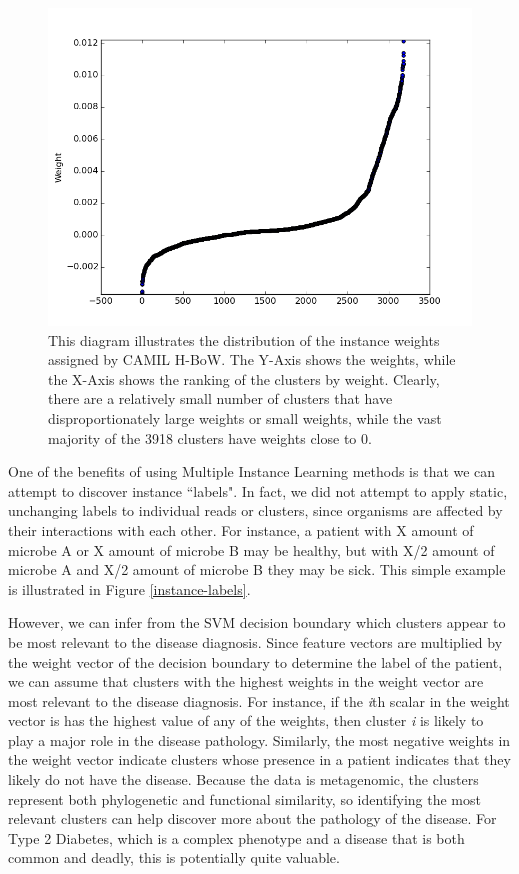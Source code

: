 \begin{figure}[h]
\centering
\includegraphics[scale=0.4]{./instance-scatter.png}
\caption{This diagram illustrates the distribution of the instance weights assigned by CAMIL H-BoW. The Y-Axis shows the weights, while the X-Axis shows the ranking of the clusters by weight. Clearly, there are a relatively small number of clusters that have disproportionately large weights or small weights, while the vast majority of the 3918 clusters have weights close to 0.} \label{instance-scatter}
\end{figure}

One of the benefits of using Multiple Instance Learning methods is that we can attempt to discover instance ``labels". In fact, we did not attempt to apply static, unchanging labels to individual reads or clusters, since organisms are affected by their interactions with each other. For instance, a patient with X amount of microbe A or X amount of microbe B may be healthy, but with X/2 amount of microbe A and X/2 amount of microbe B they may be sick. This simple example is illustrated in Figure \ref{instance-labels}.

However, we can infer from the SVM decision boundary which clusters appear to be most relevant to the disease diagnosis. Since feature vectors are multiplied by the weight vector of the decision boundary to determine the label of the patient, we can assume that clusters with the highest weights in the weight vector are most relevant to the disease diagnosis. For instance, if the \emph{i}th scalar in the weight vector is has the highest value of any of the weights, then cluster \emph{i} is likely to play a major role in the disease pathology. Similarly, the most negative weights in the weight vector indicate clusters whose presence in a patient indicates that they likely do not have the disease. Because the data is metagenomic, the clusters represent both phylogenetic and functional similarity, so identifying the most relevant clusters can help discover more about the pathology of the disease. For Type 2 Diabetes, which is a complex phenotype and a disease that is both common and deadly, this is potentially quite valuable.


